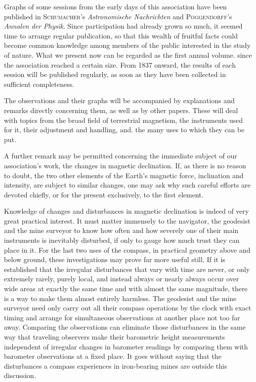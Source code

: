 Graphs of some sessions from the early days of this association have been published in \textsc{Schumacher}'s \textit{Astronomische Nachrichten} and \textsc{Poggendorff}'s \textit{Annalen der Physik}. Since participation had already grown so much, it seemed time to arrange regular publication, so that this wealth of fruitful facts could become common knowledge among members of the public interested in the study of nature. What we present now can be regarded as the first annual volume. since the association reached a certain size. From 1837 onward, the results of each session will be published regularly, as soon as they have been collected in sufficient completeness.

The observations and their graphs will be accompanied by explanations and remarks directly concerning them, as well as by other papers. These will deal with topics from the broad field of terrestrial magnetism, the instruments used for it, their adjustment and handling, and. the many uses to which they can be put.

A further remark may be permitted concerning the immediate subject of our association's work, the changes in magnetic declination. If, as there is no reason to doubt, the two other elements of the Earth's magnetic force, inclination and intensity, are subject to similar changes, one may ask why such careful efforts are devoted chiefly, or for the present exclusively, to the first element.

Knowledge of changes and disturbances in magnetic declination is indeed of very great practical interest. It must matter immensely to the navigator, the geodesist and the mine surveyor to know how often and how severely one of their main instruments is inevitably disturbed, if only to gauge how much trust they can place in it. For the last two uses of the compass, in practical geometry above and below ground, these investigations may prove far more useful still. If it is established that the irregular disturbances that vary with time are never, or only extremely rarely, purely local, and instead always or nearly always occur over wide areas at exactly the same time and with almost the same magnitude, there is a way to make them almost entirely harmless. The geodesist and the mine surveyor need only carry out all their compass operations by the clock with exact timing and arrange for simultaneous observations at another place not too far away. Comparing the observations can eliminate those disturbances in the same way that traveling observers make their barometric height measurements independent of irregular changes in barometer readings by comparing them with barometer observations at a fixed place. It goes without saying that the disturbances a compass experiences in iron-bearing mines are outside this discussion.

